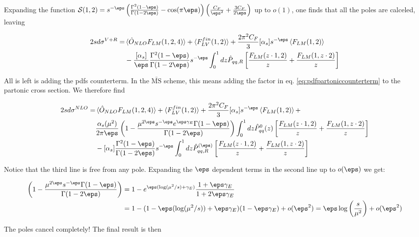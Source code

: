 \documentclass[11pt]{report}
\begin{document}
Expanding the function \(\mathcal{S}(1, 2) = s^{-\eps}\left( \frac{\Gamma^2(1-\eps)}{\Gamma(1-2\eps)} -\cos(\pi\eps)\right)\left( \frac{C_F}{\eps^2} +\frac{3C_F}{2\eps}\right)\) up to \(o(1)\), one finds that all the poles are calceled, leaving 

\begin{align}
    2sd\sigma^{V+R} = &\braket{\hat{O}_{NLO}F_{LM}(1, 2, 4)} + \braket{F_{LV}^{fin}(1, 2)} + \frac{2\pi^2C_F}{3}[\alpha_s]s^{-\eps}\braket{F_{LM}(1, 2)} \notag \\
    &- \frac{[\alpha_s]}{\eps}\frac{\Gamma^2(1-\eps)}{\Gamma(1-2\eps)}s^{-\eps}\int_0^1 dz \hat{P}_{qq, R}\left[\frac{F_{LM}(z\cdot1, 2)}{z} + \frac{F_{LM}(1, z\cdot 2)}{z}  \right]
\end{align}

All is left is adding the pdfs counterterm. In the \(\bar{\text{MS}}\) scheme, this means adding the factor in eq. \ref{eq:pdfpartoniccounterterm} to the partonic cross section. We therefore find 

\begin{align}
    2sd\sigma^{NLO} = &\braket{\hat{O}_{NLO}F_{LM}(1, 2, 4)} + \braket{F_{LV}^{fin}(1, 2)} + \frac{2\pi^2C_F}{3}[\alpha_s]s^{-\eps}\braket{F_{LM}(1, 2)} + \notag \\ 
    & \frac{\alpha_s(\mu^2)}{2\pi\eps}\left(1-\frac{\mu^{2\eps}s^{-\eps} e^{\eps\gamma_E}\Gamma(1-\eps)}{\Gamma(1-2\eps)}\right)\int_0^1 dz \hat{P}^{0}_{qq}(z) \left[\frac{F_{LM}(z\cdot1, 2)}{z} + \frac{F_{LM}(1, z\cdot 2)}{z}  \right] \notag \\ 
    &- [\alpha_s]\frac{\Gamma^2(1-\eps)}{\Gamma(1-2\eps)}s^{-\eps}\int_0^1 dz \hat{P}^{(\eps)}_{qq, R}\left[\frac{F_{LM}(z\cdot1, 2)}{z} + \frac{F_{LM}(1, z\cdot 2)}{z}  \right]
\end{align}

Notice that the third line is free from any pole. Expanding the \(\eps\) dependent terms in the second line up to \(o(\eps)\) we get:  

\begin{align}
    \left( 1 - \frac{\mu^{2\eps}s^{-\eps}\Gamma(1-\eps)}{\Gamma(1-2\eps)} \right) &= 1 - e^{\eps(\log(\mu^2/s) +\gamma_E)}\frac{1+\eps\gamma_E}{1+2\eps\gamma_E} \notag \\ 
    &= 1 - (1-\eps(\log(\mu^2/s)) + \eps\gamma_E)(1-\eps\gamma_E) + o(\eps^2) = \eps\log\left( \frac{s}{\mu^2} \right) + o(\eps^2)
\end{align}

The poles cancel completely! The final result is then
\end{document}
